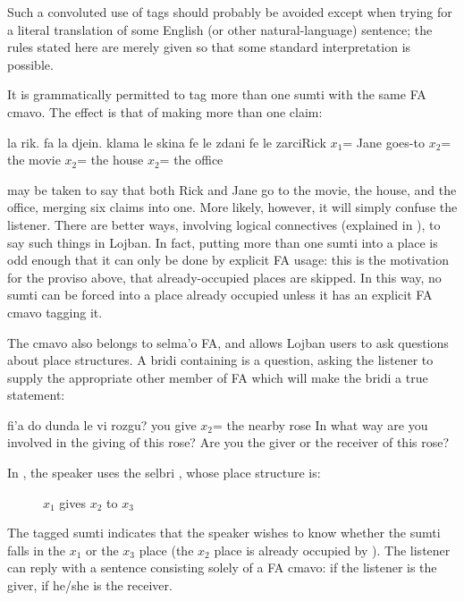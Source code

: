 Such a convoluted use of tags should probably be avoided
    except when trying for a literal translation of some English
    (or other natural-language) sentence; the rules stated here are
    merely given so that some standard interpretation is
    possible.

It is grammatically permitted to tag more than one sumti
    with the same FA cmavo. The effect is that of making more than
    one claim:
\begin{example}
 la rik. fa la djein. klama\n
\T	[fe] le skina fe le zdani fe le zarci\n
[$x_1$=] Rick $x_1$= Jane goes-to\n
\T	$x_2$= the movie $x_2$= the house $x_2$= the office
\end{example}

{\noindent}may be taken to say that both Rick and Jane go to the movie,
    the house, and the office, merging six claims into one. More
    likely, however, it will simply confuse the listener. There are
    better ways, involving logical connectives (explained in ), to say such things in
    Lojban. In fact, putting more than one sumti into a place is
    odd enough that it can only be done by explicit FA usage: this
    is the motivation for the proviso above, that already-occupied
    places are skipped. In this way, no sumti can be forced into a
    place already occupied unless it has an explicit FA cmavo
    tagging it. 

The cmavo  also belongs to selma'o FA, and allows
    Lojban users to ask questions about place structures. A bridi
    containing  is a question, asking the listener to
    supply the appropriate other member of FA which will make the
    bridi a true statement:
\begin{example}
fi'a do dunda  le vi rozgu? you give $x_2$= the nearby rose\n
In what way are you involved in the giving of this rose?\n
Are you the giver or the receiver of this rose?
\end{example}

In , the speaker uses the
    selbri , whose place structure is:
\begin{description}
\item[] $x_1$ gives $x_2$ to $x_3$
\end{description}

The tagged sumti  indicates that the speaker wishes
    to know whether the sumti  falls in the $x_1$ or the $x_3$
    place (the $x_2$ place is already occupied by ). The
    listener can reply with a sentence consisting solely of a FA
    cmavo:  if the listener is the giver,  if he/she is
    the receiver. 

